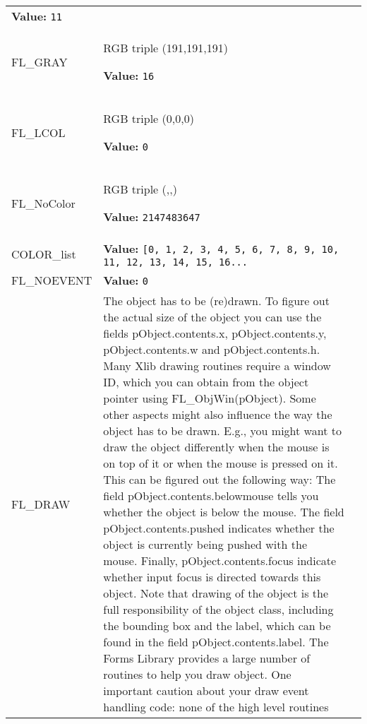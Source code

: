 \begin{longtable}{|p{\varnamewidth}|p{\vardescrwidth}|l}
\textbf{Value:} 
{\tt 11}&\\
\cline{1-2}
\raggedright F\-L\-\_\-G\-R\-A\-Y\-7\-5\- & \raggedright RGB triple (191,191,191)

\textbf{Value:} 
{\tt 16}&\\
\cline{1-2}
\raggedright F\-L\-\_\-L\-C\-O\-L\- & \raggedright RGB triple (0,0,0)

\textbf{Value:} 
{\tt 0}&\\
\cline{1-2}
\raggedright F\-L\-\_\-N\-o\-C\-o\-l\-o\-r\- & \raggedright RGB triple (,,)

\textbf{Value:} 
{\tt 2147483647}&\\
\cline{1-2}
\raggedright C\-O\-L\-O\-R\-\_\-l\-i\-s\-t\- & \raggedright \textbf{Value:} 
{\tt \texttt{[}0\texttt{, }1\texttt{, }2\texttt{, }3\texttt{, }4\texttt{, }5\texttt{, }6\texttt{, }7\texttt{, }8\texttt{, }9\texttt{, }10\texttt{, }11\texttt{, }12\texttt{, }13\texttt{, }14\texttt{, }15\texttt{, }16\texttt{...}}&\\
\cline{1-2}
\raggedright F\-L\-\_\-N\-O\-E\-V\-E\-N\-T\- & \raggedright \textbf{Value:} 
{\tt 0}&\\
\cline{1-2}
\raggedright F\-L\-\_\-D\-R\-A\-W\- & \raggedright The object has to be (re)drawn. To figure out the actual size of 
          the object you can use the fields pObject.contents.x, 
          pObject.contents.y, pObject.contents.w and pObject.contents.h. 
          Many Xlib drawing routines require a window ID, which you can 
          obtain from the object pointer using FL\_ObjWin(pObject). Some 
          other aspects might also influence the way the object has to be 
          drawn. E.g., you might want to draw the object differently when 
          the mouse is on top of it or when the mouse is pressed on it. 
          This can be figured out the following way: The field 
          pObject.contents.belowmouse tells you whether the object is below
          the mouse. The field pObject.contents.pushed indicates whether 
          the object is currently being pushed with the mouse. Finally, 
          pObject.contents.focus indicate whether input focus is directed 
          towards this object. Note that drawing of the object is the full 
          responsibility of the object class, including the bounding box 
          and the label, which can be found in the field 
          pObject.contents.label. The Forms Library provides a large number
          of routines to help you draw object. One important caution about 
          your draw event handling code: none of the high level routines 

\end{longtable}
